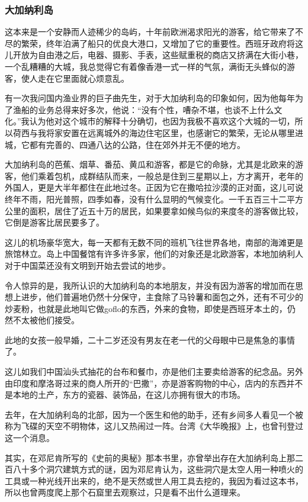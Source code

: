 \subsubsection*{大加纳利岛}
\par 这本来是一个安静而人迹稀少的岛屿，十年前欧洲渴求阳光的游客，给它带来了不尽的繁荣，终年泊满了船只的优良大港口，又增加了它的重要性。西班牙政府将这儿开放为自由港之后，电器、摄影、手表，这些赋重税的商店又挤满在大街小巷，一个乱糟糟的大城，我总觉得它有着像香港一式一样的气氛，满街无头蜂似的游客，使人走在它里面就心烦意乱。
\par 有一次我问国内渔业界的巨子曲先生，对于大加纳利岛的印象如何，因为他每年为了渔船的业务总得来好多次，他说：“没有个性，嘈杂不堪，也谈不上什么文化。”我认为他对这个城市的解释十分确切，也因为我极不喜欢这个大城的一切，所以荷西与我将家安置在远离城外的海边住宅区里，也感谢它的繁荣，无论从哪里进城，它都有完善的、四通八达的公路，住在郊外并无不便的地方。
\par 大加纳利岛的芭蕉、烟草、番茄、黄瓜和游客，都是它的命脉，尤其是北欧来的游客，他们乘着包机，成群结队而来，一般总是住到三星期以上，方才离开，老年的外国人，更是大半年都住在此地过冬。正因为它在撒哈拉沙漠的正对面，这儿可说终年不雨，阳光普照，四季如春，没有什么显明的气候变化。一千五百三十二平方公里的面积，居住了近五十万的居民，如果要拿如候鸟似的来度冬的游客做比较，它倒是游客比居民要多了。
\par 这儿的机场豪华宽大，每一天都有无数不同的班机飞往世界各地，南部的海滩更是旅馆林立。岛上中国餐馆有许多许多家，他们的对象还是北欧游客，本地加纳利人对于中国菜还没有文明到开始去尝试的地步。
\par 令人惊异的是，我所认识的大加纳利岛的本地朋友，并没有因为游客的增加而在思想上进步，他们普遍地仍然十分保守，主食除了马铃薯和面包之外，还有不可少的炒麦粉，也就是此地叫它做goflo的东西，外来的食物，即使是西班牙本土的，仍然不太被他们接受。
\par 此地的女孩一般早婚，二十二岁还没有男友在老一代的父母眼中已是焦急的事情了。
\par 这儿如我们中国汕头式抽花的台布和餐巾，亦是他们主要卖给游客的纪念品。另外由印度和摩洛哥过来的商人所开的“巴撒”，亦是游客购物的中心，店内的东西并不是本地的土产，东方的瓷器、装饰品，在这儿亦拥有很大的市场。
\par 去年，在大加纳利岛的北部，因为一个医生和他的助手，还有乡间多人看见一个被称为飞碟的天空不明物体，这儿又热闹过一阵。台湾《大华晚报》上，也曾刊登过这一个消息。
\par 其实，在邓尼肯所写的《史前的奥秘》那本书里，亦曾举出存在大加纳利岛上那二百八十多个洞穴建筑方式的谜，因为邓尼肯认为，这些洞穴是太空人用一种喷火的工具或一种光线开出来的，绝不是天然或世人用工具去挖的，我因为看过这本书，所以也曾两度爬上那个石窟里去观察过，只是看不出什么道理来。
